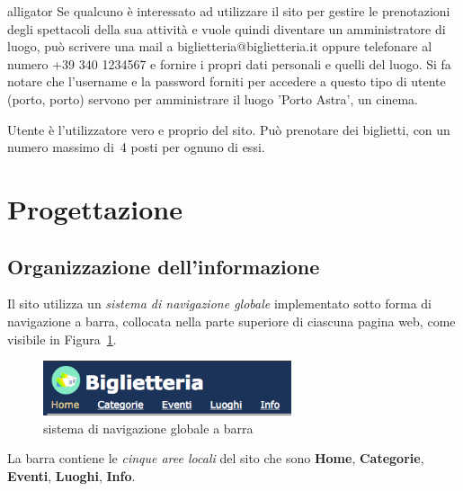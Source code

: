 \documentclass[10pt, a4paper]{article}
\begin{document}
\begin{labeling}{alligator}
	 Se qualcuno è interessato ad utilizzare il sito per gestire le prenotazioni degli spettacoli della sua attività e vuole quindi
	 diventare un amministratore di luogo, può scrivere una mail a biglietteria@biglietteria.it oppure telefonare al numero 
	 +39 340 1234567 e fornire i propri dati personali e quelli del luogo.
	 Si fa notare che l'username e la password forniti per accedere a questo tipo di utente (porto, porto) servono per amministrare il luogo 'Porto Astra', un cinema.
	\item[Utente] è l'utilizzatore vero e proprio del sito. Può prenotare
    dei biglietti, con un numero massimo di~4 posti per ognuno di essi.
\end{labeling}

\section{Progettazione}
\subsection{Organizzazione dell'informazione}
Il sito utilizza un \emph{sistema di navigazione globale} implementato sotto forma di
navigazione a barra, collocata nella parte superiore di ciascuna pagina web, come visibile
in Figura~\ref{fig:barra_no_click}.

\begin{figure}[h!]
  \centering
  \includegraphics[width=0.65\textwidth]{Images/barra_no_click.png}
  \caption{sistema di navigazione globale a barra}
  \label{fig:barra_no_click}
\end{figure}

La barra contiene le \emph{cinque aree locali} del sito che sono
\textbf{\textcolor{UniPD}{Home}}, \textbf{\textcolor{UniPD}{Categorie}}, 
\textbf{\textcolor{UniPD}{Eventi}}, \textbf{\textcolor{UniPD}{Luoghi}},
\textbf{\textcolor{UniPD}{Info}}.
\end{document}
